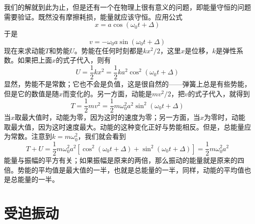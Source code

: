 我们的解就到此为止，但是还有一个在物理上很有意义的问题，即能量守恒的问题需要验证。既然没有摩擦耗损，能量就应该守恒。应用公式
\begin{equation*}
    x=a\cos(\omega_0t+\Delta)
\end{equation*}
于是
\begin{equation*}
    v=-\omega_0a\sin(\omega_0t+\Delta)
\end{equation*}
现在来求动能$T$和势能$U$。势能在任何时刻都是$kx^2/2$，这里$x$是位移，$k$是弹性系数。如果把上面$x$的式子代入，则有
\begin{equation*}
    U=\frac{1}{2}kx^2=\frac{1}{2}ka^2\cos^2(\omega_0t+\Delta)
\end{equation*}
显然，势能不是常数；它也不会是负值，这是很自然的——弹簧上总是有些势能，但是它的数值是随$x$而变化的。另一方面，动能是$mv^2/2$，把$v$的式子代入，就得到
\begin{equation*}
    T=\frac{1}{2}mv^2=\frac{1}{2}m\omega_0^2a^2\sin^2(\omega_0t+\Delta)
\end{equation*}
当$x$取最大值时，动能为零，因为这时的速度为零；另一方面，当$x$为零时，动能取最大值，因为这时速度最大。动能的这种变化正好与势能相反。但是，总能量应为常数。注意到$k=m\omega_0^2$，我们就会看到
\begin{equation*}
    T + U=\frac{1}{2}m\omega_0^2a^2[\cos^2(\omega_0t+\Delta)+\sin^2(\omega_0t+\Delta)] = \frac{1}{2}m\omega_0^2a^2
\end{equation*}
能量与振幅的平方有关；如果振幅是原来的两倍，那么振动的能量就是原来的四倍。势能的平均值是最大值的一半，也就是总能量的一半，同样，动能的平均值也是总能量的一半。

\section{受迫振动}

